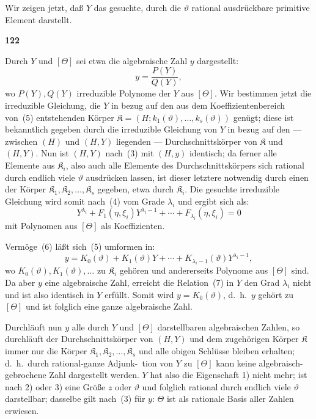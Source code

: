\documentclass[12pt,a4paper]{article}
\begin{document}
Wir zeigen jetzt, da\ss{} $Y$ das gesuchte, durch die $\vartheta$ rational ausdr\"uckbare primitive Element darstellt.

\newpage
\begin{center}
\textbf{122}
\end{center}

Durch $Y$ und $[\Theta]$ sei etwa die algebraische Zahl $y$ dargestellt:
\begin{equation}\tag{5}
y = \frac{P(Y)}{Q(Y)},\end{equation}
wo $P(Y), Q(Y)$ irreduzible Polynome der $Y$ aus $[\Theta]$. Wir bestimmen jetzt die irreduzible Gleichung, die $Y$ in bezug auf den aus dem Koeffizientenbereich von~(5) entstehenden K\"orper $\mathfrak{K} = (H; k_1(\vartheta), \ldots, k_s(\vartheta))$ gen\"ugt; diese ist bekanntlich gegeben durch die irreduzible Gleichung von $Y$ in bezug auf den --- zwischen $(H)$ und $(H, Y)$ liegenden --- Durchschnittsk\"orper von $\mathfrak{K}$ und $(H, Y)$. Nun ist $(H, Y)$ nach~(3) mit $(H, y)$ identisch; da ferner alle Elemente aus $\mathfrak{K}_i$, also auch alle Elemente des Durchschnittsk\"orpers sich rational durch endlich viele $\vartheta$ ausdr\"ucken lassen, ist dieser letztere notwendig durch einen der K\"orper $\mathfrak{K}_1, \mathfrak{K}_2, \ldots, \mathfrak{K}_s$ gegeben, etwa durch $\mathfrak{K}_i$. Die gesuchte irreduzible Gleichung wird somit nach~(4) vom Grade $\lambda_i$ und ergibt sich als:
\begin{equation}\tag{6}
Y^{\lambda_i} + F_1(\eta, \xi_i) Y^{\lambda_i-1} + \cdots + F_{\lambda_i}(\eta, \xi_i) = 0
\end{equation}
mit Polynomen aus $[\Theta]$ als Koeffizienten.

Verm\"oge~(6) l\"a\ss t sich~(5) umformen in:
\begin{equation}\tag{7}
y = K_0(\vartheta) + K_1(\vartheta) Y + \cdots + K_{\lambda_i-1}(\vartheta) Y^{\lambda_i-1},\end{equation}
wo $K_0(\vartheta), K_1(\vartheta), \ldots$ zu $\mathfrak{K}_i$ geh\"oren und andererseits Polynome aus $[\Theta]$ sind. Da aber $y$ eine algebraische Zahl, erreicht die Relation~(7) in $Y$ den Grad $\lambda_i$ nicht und ist also identisch in $Y$ erf\"ullt. Somit wird $y = K_0(\vartheta)$, d.\ h.\ $y$ geh\"ort zu $[\Theta]$ und ist folglich eine ganze algebraische Zahl.

Durchl\"auft nun $y$ alle durch $Y$ und $[\Theta]$ darstellbaren algebraischen Zahlen, so durchl\"auft der Durchschnittsk\"orper von $(H, Y)$ und dem zugeh\"origen K\"orper $\mathfrak{K}$ immer nur die K\"orper $\mathfrak{K}_1, \mathfrak{K}_2, \ldots, \mathfrak{K}_s$ und alle obigen Schl\"usse bleiben erhalten; d.\ h.\ durch rational-ganze Adjunk-\ tion von $Y$ zu $[\Theta]$ kann keine algebraisch-gebrochene Zahl dargestellt werden. $Y$ hat also die Eigenschaft 1) nicht mehr; ist nach 2) oder 3) eine Gr\"o\ss e $z$ oder $\vartheta$ und folglich rational durch endlich viele $\vartheta$ darstellbar; dasselbe gilt nach~(3) f\"ur $y$: $\Theta$ ist als rationale Basis aller Zahlen erwiesen.
\end{document}
